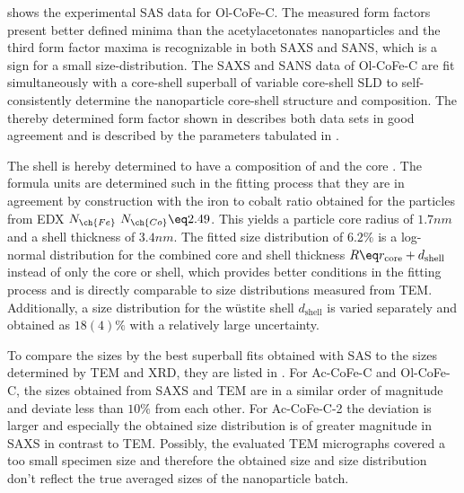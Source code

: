 \documentclass[\main/dresen_thesis.tex]{subfiles}
\begin{document}
     shows the experimental SAS data for Ol-CoFe-C.
    The measured form factors present better defined minima than the acetylacetonates nanoparticles and the third form factor maxima is recognizable in both SAXS and SANS, which is a sign for a small size-distribution.
    The SAXS and SANS data of Ol-CoFe-C are fit simultaneously with a core-shell superball of variable core-shell SLD to self-consistently determine the nanoparticle core-shell structure and composition.
    The thereby determined form factor shown in  describes both data sets in good agreement and is described by the parameters tabulated in .

    The shell is hereby determined to have a composition of  and the core .
    The formula units are determined such in the fitting process that they are in agreement by construction with the iron to cobalt ratio obtained for the particles from EDX $N_{\ch{Fe}} \ N_{\ch{Co}} \eq 2.49$.
    This yields a particle core radius of $1.7 \unit{nm}$ and a shell thickness of $3.4 \unit{nm}$.
    The fitted size distribution of $6.2 \%$ is a log-normal distribution for the combined core and shell thickness $R \eq r_\mathrm{core} + d_\mathrm{shell}$ instead of only the core or shell, which provides better conditions in the fitting process and is directly comparable to size distributions measured from TEM.
    Additionally, a size distribution for the w\"ustite shell $d_\mathrm{shell}$ is varied separately and obtained as $18(4) \%$ with a relatively large uncertainty.

    To compare the sizes by the best superball fits obtained with SAS to the sizes determined by TEM and XRD, they are listed in .
    For Ac-CoFe-C and Ol-CoFe-C, the sizes obtained from SAXS and TEM are in a similar order of magnitude and deviate less than $10 \%$ from each other.
    For Ac-CoFe-C-2 the deviation is larger and especially the obtained size distribution is of greater magnitude in SAXS in contrast to TEM.
    Possibly, the evaluated TEM micrographs covered a too small specimen size and therefore the obtained size and size distribution don't reflect the true averaged sizes of the nanoparticle batch.
\end{document}
